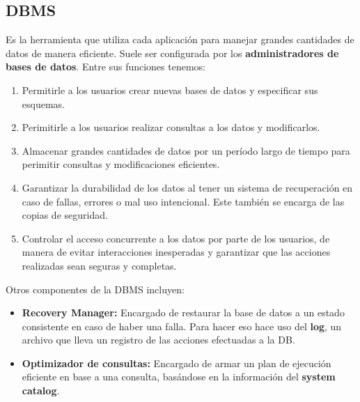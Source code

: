 \subsection*{DBMS}
Es la herramienta que utiliza cada aplicación para manejar grandes cantidades de datos de manera eficiente. Suele ser configurada por los \textbf{administradores de bases de datos}.
Entre sus funciones tenemos:
\begin{enumerate}
    \item Permitirle a los usuarios crear nuevas bases de datos y especificar sus esquemas.
    \item Perimitirle a los usuarios realizar consultas a los datos y modificarlos.
    \item Almacenar grandes cantidades de datos por un período largo de tiempo para perimitir consultas y modificaciones eficientes.
    \item Garantizar la durabilidad de los datos al tener un sistema de recuperación en caso de fallas, errores o mal uso intencional. Este también se encarga de las copias de seguridad.
    \item Controlar el acceso concurrente a los datos por parte de los usuarios, de manera de evitar interacciones inesperadas y garantizar que las acciones realizadas sean seguras y completas.
\end{enumerate}
Otros componentes de la DBMS incluyen:
\begin{itemize}
    \item \textbf{Recovery Manager:} Encargado de restaurar la base de datos a un estado consistente en caso de haber una falla. Para hacer eso hace uso del \textbf{log}, un archivo que lleva un registro de las acciones efectuadas a la DB.
    \item \textbf{Optimizador de consultas:} Encargado de armar un plan de ejecución eficiente en base a una consulta, basándose en la información del \textbf{system catalog}.
\end{itemize}

